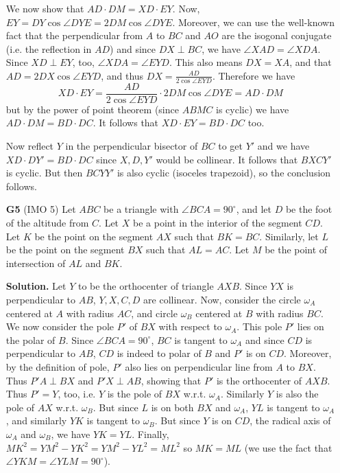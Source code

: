 \documentclass[11pt,a4paper]{article}
\begin{document}
\begin{enumerate}
	We now show that $AD\cdot DM=XD\cdot EY$. Now, $EY=DY\cos \angle DYE=2DM\cos\angle DYE$. 
	Moreover, we can use the well-known fact that the perpendicular from $A$ to $BC$ and $AO$ are the isogonal conjugate (i.e. the reflection in $AD$) and since $DX\perp BC$, we have $\angle XAD=\angle XDA$. Since $XD\perp EY$, too, $\angle XDA=\angle EYD$. 
	This also means $DX=XA$, and that $AD=2DX\cos\angle EYD$, and thus $DX=\frac{AD}{2\cos\angle EYD}$. Therefore we have 
	\[XD\cdot EY=\frac{AD}{2\cos\angle EYD}\cdot 2DM\cos\angle DYE=AD\cdot DM
	\]
	but by the power of point theorem (since $ABMC$ is cyclic) we have $AD\cdot DM=BD\cdot DC$. It follows that $XD\cdot EY=BD\cdot DC$ too. 
	
	Now reflect $Y$ in the perpendicular bisector of $BC$ to get $Y'$ and we have $XD\cdot DY'=BD\cdot DC$ since $X, D, Y'$ would be collinear. It follows that $BXCY'$ is cyclic. 
	But then $BCYY'$ is also cyclic (isoceles trapezoid), so the conclusion follows. 
	
	\item[\textbf{G5}] (IMO 5) Let $ABC$ be a triangle with $\angle BCA=90^{\circ}$, and let $D$ be the foot of the altitude from $C$. Let $X$ be a point in the interior of the segment $CD$. Let $K$ be the point on the segment $AX$ such that $BK=BC$. Similarly, let $L$ be the point on the segment $BX$ such that $AL=AC$. Let $M$ be the point of intersection of $AL$ and $BK$.
	
	\textbf{Solution.} Let $Y$ to be the orthocenter of triangle $AXB$. Since $YX$ is perpendicular to $AB$, $Y, X, C, D$ are collinear. Now, consider the circle $\omega_A$ centered at $A$ with radius $AC$, and circle $\omega_B$ centered at $B$ with radius $BC$. We now consider the pole $P'$ of $BX$ with respect to $\omega_A$. This pole $P'$ lies on the polar of $B$. Since $\angle BCA=90^{\circ}$, $BC$ is tangent to $\omega_A$ and since $CD$ is perpendicular to $AB$, $CD$ is indeed to polar of $B$ and $P'$ is on $CD$. 
	Moreover, by the definition of pole, $P'$ also lies on perpendicular line from $A$ to $BX$. Thus $P'A\perp BX$ and $P'X\perp AB$, showing that $P'$ is the orthocenter of $AXB$. Thus $P'=Y$, too, i.e. $Y$ is the pole of $BX$ w.r.t. $\omega_A$. Similarly $Y$ is also the pole of $AX$ w.r.t. $\omega_B$. But since $L$ is on both $BX$ and $\omega_A$, $YL$ is tangent to $\omega_A$, and similarly $YK$ is tangent to $\omega_B$. But since $Y$ is on $CD$, the radical axis of $\omega_A$ and $\omega_B$, we have $YK=YL$. Finally, $MK^2=YM^2-YK^2=YM^2-YL^2=ML^2$ so $MK=ML$ (we use the fact that $\angle YKM=\angle YLM=90^{\circ}$). 
	

\end{enumerate}
\end{document}
